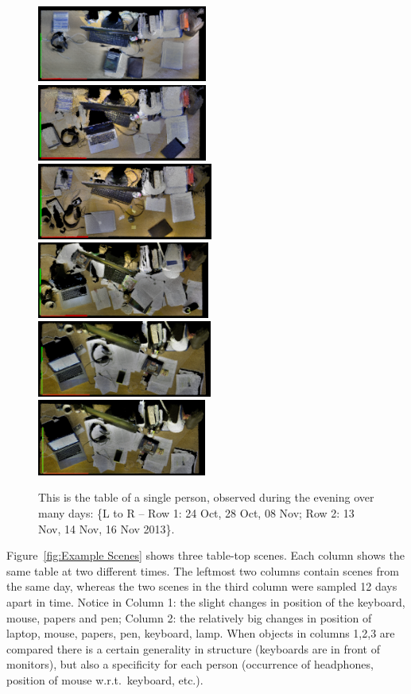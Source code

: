\documentclass[letterpaper, 10 pt, conference]{ieeeconf}  %
\begin{document}
\begin{figure}[bhtp]
\begin{center}
\includegraphics[height=2.5cm]{131024} \smallskip
\includegraphics[height=2.5cm]{131028} \smallskip
\includegraphics[height=2.5cm]{131108} \\
\includegraphics[height=2.5cm]{131113} \smallskip
\includegraphics[height=2.5cm]{131114} \smallskip
\includegraphics[height=2.5cm]{131116} 
\caption{This is the table of a single person, observed during the evening over many days: \{L to R -- Row 1: 24 Oct, 28 Oct, 08 Nov; Row 2: 13 Nov, 14 Nov, 16 Nov 2013\}. }
\label{fig:Variation_Over_Days}
\end{center}
\end{figure}

Figure~\ref{fig:Example Scenes} shows three table-top scenes. Each column shows the same table at two different times. The leftmost two columns 
contain scenes from the same day, whereas the two scenes in the third column were sampled 12 days apart in time. Notice in Column 1: the slight changes in 
position of the keyboard, mouse, papers and pen; Column 2: the relatively big changes in position of laptop, mouse, papers, pen, keyboard, 
lamp. When objects in columns 1,2,3 are compared there is a certain generality in structure (keyboards are in front of monitors), but 
also a specificity for each person (occurrence of headphones, position of mouse w.r.t.\ keyboard, etc.). 
\end{document}
